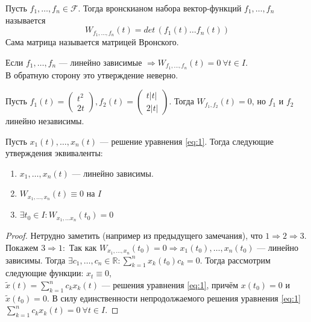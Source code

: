 \documentclass[11pt]{article}
\begin{document}
\begin{definition}
    Пусть $f_1, \ldots, f_n \in \mathcal{F}$. Тогда вронскианом набора вектор-функций $f_1, \ldots, f_n$ называется
    \[ W_{f_1, \ldots, f_n} (t) = det\, (f_1(t) \ldots f_n(t)) \] 
    Сама матрица называется матрицей Вронского. 
\end{definition}

\begin{remark}
    Если $f_1, \ldots, f_n$ --- линейно зависимые $\Rightarrow W_{f_1, \ldots, f_n}(t) = 0 \ \forall t\in I$.\\
    В обратную сторону это утверждение неверно.
\end{remark}

\begin{example}
    Пусть $f_1(t)= 
    \begin{pmatrix}
        t^2\\
        2t  
    \end{pmatrix}
    , f_2(t) = \begin{pmatrix}
        t|t| \\
        2|t|
    \end{pmatrix}    
    $. Тогда $W_{f_1, f_2}(t) = 0$, но $f_1$ и $f_2$ линейно независимы. 
\end{example}


\begin{statement}
    Пусть $x_1(t), \ldots, x_n(t)$ --- решение уравнения \eqref{eq:1}. Тогда следующие утверждения эквиваленты:
    \begin{enumerate}
        \item $x_1, \ldots, x_n(t)$ --- линейно зависимы.
        \item $W_{x_1, \ldots, x_n}(t) \equiv 0 $ на $I$
        \item $\exists t_0\in I: W_{x_1, \ldots x_n}(t_0) = 0$
    \end{enumerate}
\end{statement}

\begin{proof}
    Нетрудно заметить (например из предыдущего замечания), что $1\Rightarrow 2 \Rightarrow 3$.\\
    Покажем $3\Rightarrow 1:$ Так как $W_{x_1,\ldots, x_n}(t_0) = 0 \Rightarrow x_1(t_0), \ldots, x_n(t_0)$ --- линейно зависимы. Тогда $\displaystyle \exists c_1, \ldots, c_n\in \mathbb{R}: \sum_{k=1}^{n} x_k(t_0)c_k = 0 $. 
    Тогда рассмотрим следующие функции: $\displaystyle x_t\equiv 0$,\\
    $ \displaystyle \tilde{x}(t)=\sum_{k=1}^{n} c_kx_k(t)$ --- решения уравнения \eqref{eq:1}, причём $x(t_0)=0$ и $\tilde{x}(t_0)=0$. 
    В силу единственности непродолжаемого решения уравнения \eqref{eq:1} $\displaystyle \sum_{k=1}^{n} c_k x_k(t) =0 \ \forall t\in I$. 
\end{proof}
\end{document}
